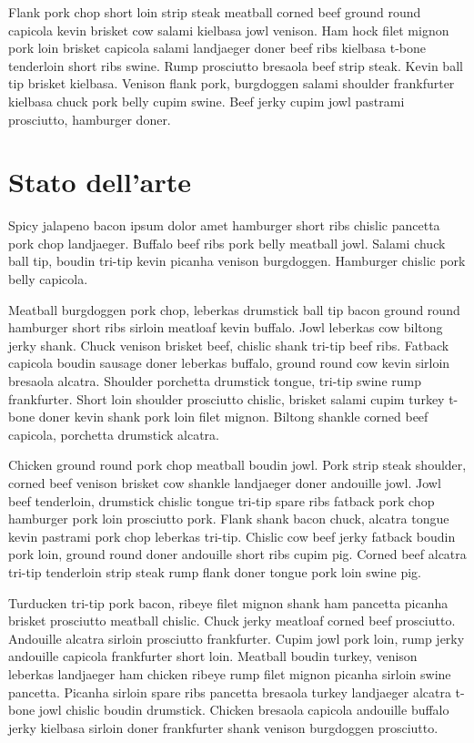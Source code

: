 \documentclass[a4paper]{article}
\begin{document}
Flank pork chop short loin strip steak meatball corned beef ground round capicola kevin brisket cow salami kielbasa jowl venison. Ham hock filet mignon pork loin brisket capicola salami landjaeger doner beef ribs kielbasa t-bone tenderloin short ribs swine. Rump prosciutto bresaola beef strip steak. Kevin ball tip brisket kielbasa. Venison flank pork, burgdoggen salami shoulder frankfurter kielbasa chuck pork belly cupim swine. Beef jerky cupim jowl pastrami prosciutto, hamburger doner.

\section{Stato dell'arte}

Spicy jalapeno bacon ipsum dolor amet hamburger short ribs chislic pancetta pork chop landjaeger. Buffalo beef ribs pork belly meatball jowl. Salami chuck ball tip, boudin tri-tip kevin picanha venison burgdoggen. Hamburger chislic pork belly capicola.

Meatball burgdoggen pork chop, leberkas drumstick ball tip bacon ground round hamburger short ribs sirloin meatloaf kevin buffalo. Jowl leberkas cow biltong jerky shank. Chuck venison brisket beef, chislic shank tri-tip beef ribs. Fatback capicola boudin sausage doner leberkas buffalo, ground round cow kevin sirloin bresaola alcatra. Shoulder porchetta drumstick tongue, tri-tip swine rump frankfurter. Short loin shoulder prosciutto chislic, brisket salami cupim turkey t-bone doner kevin shank pork loin filet mignon. Biltong shankle corned beef capicola, porchetta drumstick alcatra.

Chicken ground round pork chop meatball boudin jowl. Pork strip steak shoulder, corned beef venison brisket cow shankle landjaeger doner andouille jowl. Jowl beef tenderloin, drumstick chislic tongue tri-tip spare ribs fatback pork chop hamburger pork loin prosciutto pork. Flank shank bacon chuck, alcatra tongue kevin pastrami pork chop leberkas tri-tip. Chislic cow beef jerky fatback boudin pork loin, ground round doner andouille short ribs cupim pig. Corned beef alcatra tri-tip tenderloin strip steak rump flank doner tongue pork loin swine pig.

Turducken tri-tip pork bacon, ribeye filet mignon shank ham pancetta picanha brisket prosciutto meatball chislic. Chuck jerky meatloaf corned beef prosciutto. Andouille alcatra sirloin prosciutto frankfurter. Cupim jowl pork loin, rump jerky andouille capicola frankfurter short loin. Meatball boudin turkey, venison leberkas landjaeger ham chicken ribeye rump filet mignon picanha sirloin swine pancetta. Picanha sirloin spare ribs pancetta bresaola turkey landjaeger alcatra t-bone jowl chislic boudin drumstick. Chicken bresaola capicola andouille buffalo jerky kielbasa sirloin doner frankfurter shank venison burgdoggen prosciutto.
\end{document}
